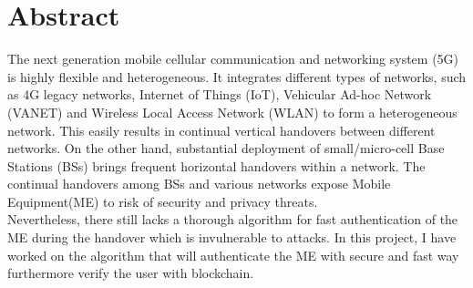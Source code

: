 \chapter*{\centering Abstract}

{
    The next generation mobile cellular communication
and networking system (5G) is highly flexible and heterogeneous.
It integrates different types of networks, such as 4G legacy
networks, Internet of Things (IoT), Vehicular Ad-hoc Network
(VANET) and Wireless Local Access Network (WLAN) to form
a heterogeneous network. This easily results in continual vertical
handovers between different networks. On the other hand,
substantial deployment of small/micro-cell Base Stations (BSs) brings
frequent horizontal handovers within a network. The continual
handovers among BSs and various networks expose Mobile
Equipment(ME) to risk of security and privacy threats.\\[1.5\baselineskip]
}
{
    Nevertheless, there still lacks a thorough algorithm for fast 
authentication of the ME during the handover which is invulnerable to 
attacks. In this project, I have worked on the algorithm that will  
authenticate the ME with secure and fast way furthermore verify the user with 
blockchain.
}